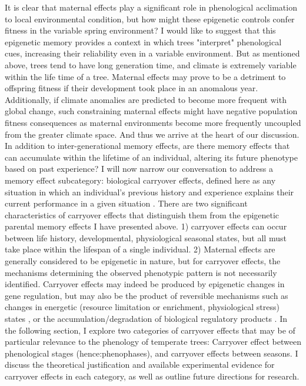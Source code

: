 \documentclass{article}\usepackage[]{graphicx}\usepackage[]{color}
\begin{document}
\par It is clear that maternal effects play a significant role in phenological acclimation to local environmental condition, but how might these epigenetic controls confer fitness in the variable spring environment? I would like to suggest that this epigenetic memory provides a context in which trees "interpret" phenological cues, increasing their reliability even in a variable environment. But as mentioned above, trees tend to have long generation time, and climate is extremely variable within the life time of a tree. Maternal effects may prove to be a detriment to offspring fitness if their development took place in an anomalous year. Additionally, if climate anomalies are predicted to become more frequent with global change, such constraining maternal effects might have negative population fitness consequences as maternal environments become more frequently uncoupled from the greater climate space. And thus we arrive at the heart of our discussion. In addition to inter-generational memory effects, are there memory effects that can accumulate within the lifetime of an individual, altering its future phenotype based on past experience? I will now narrow our conversation to address a memory effect subcategory: biological carryover effects, defined here as any situation in which an individual's previous history and experience explains their current performance in a given situation \citep{OConnor2014}. There are two significant characteristics of carryover effects that distinguish them from the epigenetic parental memory effects I have presented above. 1) carryover effects can occur between life history, developmental, physiological seasonal states, but all must take place within the lifespan of a single individual. 2) Maternal effects are generally considered to be epigenetic in nature, but for carryover effects, the mechanisms determining the observed phenotypic pattern is not necessarily identified. Carryover effects may indeed be produced by epigenetic changes in gene regulation, but may also be the product of reversible mechanisms such as changes in energetic (resource limitation or enrichment, physiological stress) states \citep{OConnor2014}, or the accumulation/degradation of biological regulatory products \citep{Gomory2014}. In the following section, I explore two categories of carryover effects that may be of particular relevance to the phenology of temperate trees: Carryover effect between phenological stages (hence:phenophases), and carryover effects between seasons. I discuss the theoretical justification and available experimental evidence for carryover effects in each category, as well as outline future directions for research.
\end{document}
